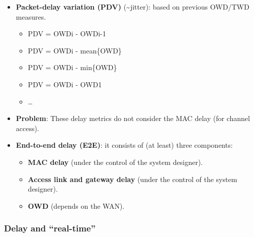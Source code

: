 \documentclass[
]{article}
\providecommand{\tightlist}{%
  \setlength{\itemsep}{0pt}\setlength{\parskip}{0pt}}
\begin{document}
\begin{itemize}
\item
  \textbf{Packet-delay variation (PDV)} (\textasciitilde jitter): based
  on previous OWD/TWD measures.

  \begin{itemize}
  \tightlist
  \item
    PDV = \textbar OWDi - OWDi-1\textbar{}
  \item
    PDV = \textbar OWDi - mean\{OWD\}\textbar{}
  \item
    PDV = \textbar OWDi - min\{OWD\}\textbar{}
  \item
    PDV = \textbar OWDi - OWD1\textbar{}
  \item
    \ldots{}
  \end{itemize}
\item
  \textbf{Problem}: These delay metrics do not consider the MAC delay
  (for channel access).
\item
  \textbf{End-to-end delay (E2E)}: it consists of (at least) three
  components:

  \begin{itemize}
  \tightlist
  \item
    \textbf{MAC delay} (under the control of the system designer).
  \item
    \textbf{Access link and gateway delay} (under the control of the
    system designer).
  \item
    \textbf{OWD} (depends on the WAN).
  \end{itemize}
\end{itemize}

\subsubsection{Delay and ``real-time''}\label{delay-and-real-time}
\end{document}
